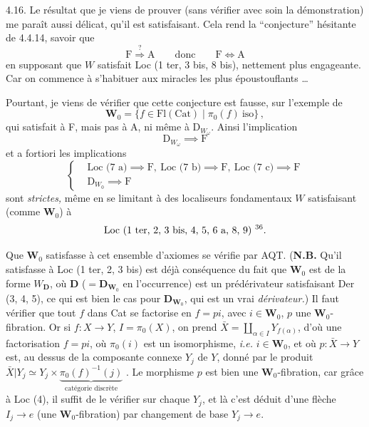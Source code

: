 4.16. Le résultat que je viens de prouver (sans vérifier avec soin la démonstration) me paraît aussi délicat, qu'il est satisfaisant. Cela rend la “conjecture” hésitante de 4.4.14, savoir que
\[
\mathrm{F} \overset{?}{\Longrightarrow} \mathrm{A} \qquad \text{donc} \qquad \mathrm{F}\Longleftrightarrow\mathrm{A}
\]
en supposant que $W$ satisfait Loc (1 ter, 3 bis, 8 bis), nettement plus engageante. Car on commence à s'habituer aux miracles les plus époustouflants \ldots

Pourtant, je viens de vérifier que cette conjecture est fausse, sur l'exemple de
\[
\mathbf{W}_0=\{f\in\mathrm{Fl}(\mathrm{Cat})\mid\pi_0(f)\ \mathrm{iso}\}\,,
\]
qui satisfait à F, mais pas à A, ni même à $\mathrm{D}_{W_\omega}$. Ainsi l'implication
\[
\mathrm{D}_{W_\omega} \implies \mathrm{F}
\]
et a fortiori les implications
\[
\left\{
\begin{aligned}
&\text{Loc (7 a)} \implies \mathrm{F},\ \text{Loc (7 b)} \implies \mathrm{F},\ \text{Loc (7 c)} \implies \mathrm{F}\\
&\mathrm{D}_{W_0} \implies \mathrm{F}
\end{aligned}
\right.
\]
sont \textit{strictes,} même en se limitant à des localiseurs fondamentaux $W$ satisfaisant (comme $\mathbf{W}_0$) à
\[
\text{Loc (1 ter, 2, 3 bis, 4, 5, 6 a, 8, 9)}\ \text{\footnotemark[36]}.
\]


Que $\mathbf{W}_0$ satisfasse à cet ensemble d'axiomes se vérifie par AQT. (\textbf{N.B.} Qu'il satisfasse à Loc (1 ter, 2, 3 bis) est déjà conséquence du fait que $\mathbf{W}_0$ est de la forme $W_{\mathbf{D}}$, où $\mathbf{D}$ ($=\mathbf{D}_{\mathbf{W}_0}$ en l'occurrence) est un prédérivateur satisfaisant Der (3, 4, 5), ce qui est bien le cas pour $\mathbf{D}_{\mathbf{W}_0}$, qui est un vrai \textit{dérivateur.}) Il faut vérifier que tout $f$ dans Cat se factorise en $f = pi$, avec $i \in \mathbf{W}_0$, $p$ une $\mathbf{W}_0$-fibration. Or si $f : X \longrightarrow Y$, $I = \pi_0(X)$, on prend $\bar{X} = \coprod_{\alpha\in I} Y_{f(\alpha)}$, d'où une factorisation $f = pi$, où $\pi_0(i)$ est un isomorphisme, \textit{i.e.} $i \in \mathbf{W}_0$, et où $p : \bar{X} \longrightarrow Y$ est, au dessus de la composante connexe $Y_j$ de $Y$, donné par le produit $\bar{X}|Y_j \simeq Y_j \times \underbrace{\pi_0(f)^{-1}(j)}_{\text{catégorie discrète}}$ . Le morphisme $p$ est bien une $\mathbf{W}_0$-fibration, car grâce à Loc (4), il suffit de le vérifier sur chaque $Y_j$, et là c'est déduit d'une flèche $I_j \longrightarrow e$ (une $\mathbf{W}_0$-fibration) par changement de base $Y_j \longrightarrow e$.

